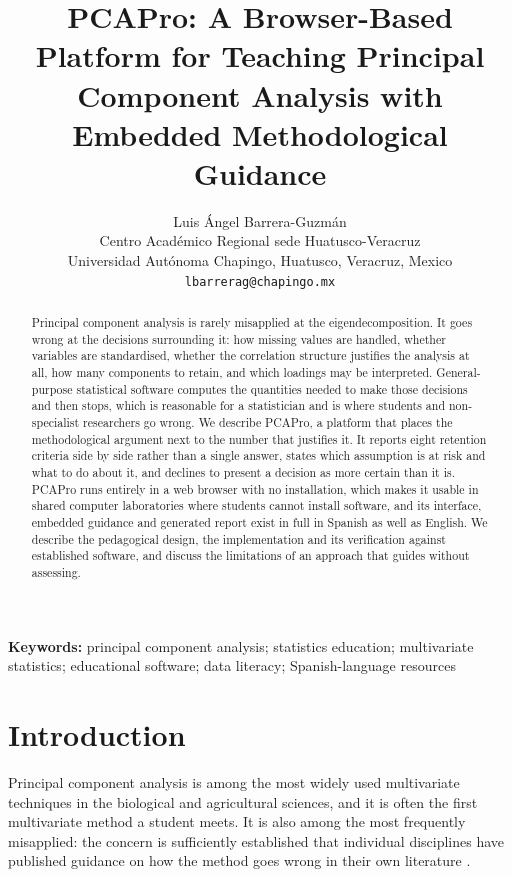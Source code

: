 \documentclass[12pt]{article}
\title{\textbf{PCAPro: A Browser-Based Platform for Teaching Principal
Component Analysis with Embedded Methodological Guidance}}
\author{Luis Ángel Barrera-Guzmán\\
Centro Académico Regional sede Huatusco-Veracruz\\
Universidad Autónoma Chapingo, Huatusco, Veracruz, Mexico\\
\texttt{lbarrerag@chapingo.mx}}
\date{}
\begin{document}
\maketitle

\begin{abstract}
Principal component analysis is rarely misapplied at the eigendecomposition.
It goes wrong at the decisions surrounding it: how missing values are handled,
whether variables are standardised, whether the correlation structure justifies
the analysis at all, how many components to retain, and which loadings may be
interpreted. General-purpose statistical software computes the quantities needed
to make those decisions and then stops, which is reasonable for a statistician
and is where students and non-specialist researchers go wrong. We describe
PCAPro, a platform that places the methodological argument next to the number
that justifies it. It reports eight retention criteria side by side rather than
a single answer, states which assumption is at risk and what to do about it, and
declines to present a decision as more certain than it is. PCAPro runs entirely
in a web browser with no installation, which makes it usable in shared computer
laboratories where students cannot install software, and its interface, embedded
guidance and generated report exist in full in Spanish as well as English. We
describe the pedagogical design, the implementation and its verification against
established software, and discuss the limitations of an approach that guides
without assessing.
\end{abstract}

\noindent\textbf{Keywords:} principal component analysis; statistics education;
multivariate statistics; educational software; data literacy; Spanish-language
resources

\section{Introduction}

Principal component analysis \citep{pearson1901, hotelling1933, jolliffe2002,
jolliffe2016, greenacre2022} is among the most widely used multivariate
techniques in the biological and agricultural sciences, and it is often the
first multivariate method a student meets. It is also among the most frequently
misapplied: the concern is sufficiently established that individual disciplines
have published guidance on how the method goes wrong in their own literature
\citep{allee2022}.
\end{document}
